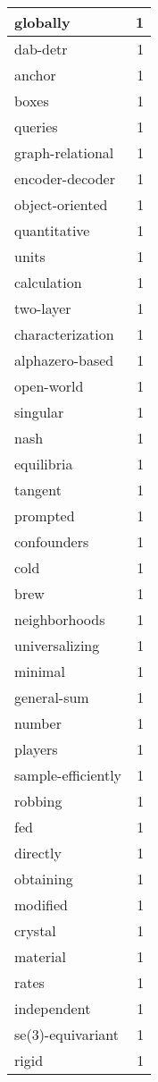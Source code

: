 \begin{table}[h]
\begin{tabular}{|l|r|}
\hline
globally & 1 \\
\hline
dab-detr & 1 \\
\hline
anchor & 1 \\
\hline
boxes & 1 \\
\hline
queries & 1 \\
\hline
graph-relational & 1 \\
\hline
encoder-decoder & 1 \\
\hline
object-oriented & 1 \\
\hline
quantitative & 1 \\
\hline
units & 1 \\
\hline
calculation & 1 \\
\hline
two-layer & 1 \\
\hline
characterization & 1 \\
\hline
alphazero-based & 1 \\
\hline
open-world & 1 \\
\hline
singular & 1 \\
\hline
nash & 1 \\
\hline
equilibria & 1 \\
\hline
tangent & 1 \\
\hline
prompted & 1 \\
\hline
confounders & 1 \\
\hline
cold & 1 \\
\hline
brew & 1 \\
\hline
neighborhoods & 1 \\
\hline
universalizing & 1 \\
\hline
minimal & 1 \\
\hline
general-sum & 1 \\
\hline
number & 1 \\
\hline
players & 1 \\
\hline
sample-efficiently & 1 \\
\hline
robbing & 1 \\
\hline
fed & 1 \\
\hline
directly & 1 \\
\hline
obtaining & 1 \\
\hline
modified & 1 \\
\hline
crystal & 1 \\
\hline
material & 1 \\
\hline
rates & 1 \\
\hline
independent & 1 \\
\hline
se(3)-equivariant & 1 \\
\hline
rigid & 1 \\

\end{tabular}
\end{table}
